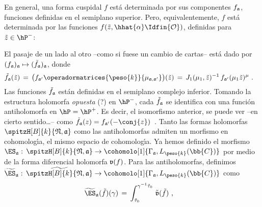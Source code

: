 En general, una forma cuspidal $f$ est\'{a} determinada por sus componentes
$f_{\frak{a}}$, funciones definidas en el semiplano superior. Pero,
equivalentemente, $f$ est\'{a} determinada por las funciones
$f(\tilde{z},\hhat{\alpha}\Idfin{\cal{O}})$, definidas para
$\tilde{z}\in\hP^{-}$:
\begin{center}
\end{center}
El pasaje de un lado al otro --como si fuese un cambio de cartas-- est\'{a}
dado por $(f_{\frak{a}})_{\frak{a}}\mapsto (\tilde{f}_{\frak{a}})_{\frak{a}}$,
donde
\begin{align*}
	\tilde{f}_{\frak{a}}(\tilde{z}) & \,=\,\big(f_{\frak{a}'}
		\operadormatrices{\peso{k}}{\mu_{\frak{a},\frak{a}'}}\big)
			(\tilde{z})\,=\,J_{1}(\mu_{1},\tilde{z})^{-1}\,
		f_{\frak{a}'}(\mu_{1}\tilde{z})^{\mu}
	\text{ .}
\end{align*}
%
Las funciones $\tilde{f}_{\frak{a}}$ est\'{a}n definidas en el semiplano
complejo inferior. Tomando la estructura holomorfa \emph{opuesta} (?) en
$\hP^{-}$, cada $\tilde{f}_{\frak{a}}$ se identifica con una funci\'{o}n
antiholomorfa en $\hP=\hP^{+}$. Es decir, el isomorfismo anterior, se puede
ver --en cierto sentido\dots-- como
\begin{math}
	\tilde{f}_{\frak{a}}(z)=f_{\frak{a}'}(-\conj{z})
\end{math}~.
Tanto las formas holomorfas $\spitzH[B]{k}{\frak{N},\frak{a}}$ como las
antiholomorfas admiten un morfismo en cohomolog\'{\i}a, el mismo espacio de
cohomolog\'{\i}a. Ya hemos definido el morfismo
\begin{math}
	\ES_{\frak{a}}:\,\spitzH[B]{k}{\frak{N},\frak{a}}\rightarrow
		\cohomolo[1]{\Gamma_{\frak{a}},L_{\peso{k}}(\bb{C})}
\end{math}
por medio de la forma diferencial holomorfa $\frak{v}(f)$. Para las
antiholomorfas, definimos
\begin{math}
	\widetilde{\ES}_{\frak{a}}:\,\widetilde{%
		\spitzH[B]{k}{\frak{N},\frak{a}}}\rightarrow
		\cohomolo[1]{\Gamma_{\frak{a}},L_{\peso{k}}(\bb{C})}
\end{math}
como
\begin{align*}
	\widetilde{\ES}_{\frak{a}}(\tilde{f})(\gamma) & \,=\,
		\int_{\tilde{\tau}_{0}}^{\gamma^{-1}\tilde{\tau}_{0}}\,
		\tilde{\frak{v}}(\tilde{f})
	\text{ ,}
\end{align*}
